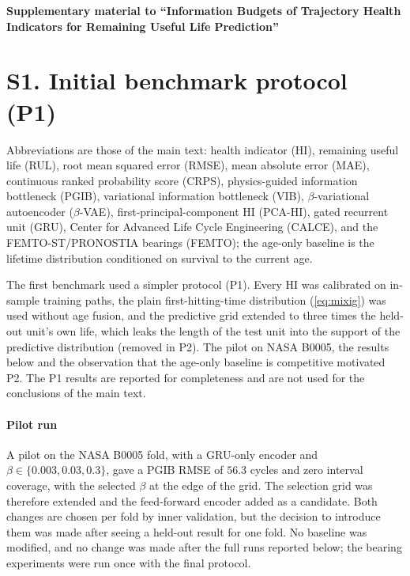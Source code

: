 \documentclass[preprint,12pt]{elsarticle}
\theoremstyle{definition}
\begin{document}
\begin{center}\textbf{Supplementary material to ``Information Budgets of Trajectory Health Indicators for Remaining Useful Life Prediction''}\end{center}
\medskip
\section*{S1. Initial benchmark protocol (P1)}
Abbreviations are those of the main text: health indicator (HI), remaining useful life (RUL), root mean squared error (RMSE), mean absolute error (MAE), continuous ranked probability score (CRPS), physics-guided information bottleneck (PGIB), variational information bottleneck (VIB), $\beta$-variational autoencoder ($\beta$-VAE), first-principal-component HI (PCA-HI), gated recurrent unit (GRU), Center for Advanced Life Cycle Engineering (CALCE), and the FEMTO-ST/PRONOSTIA bearings (FEMTO); the age-only baseline is the lifetime distribution conditioned on survival to the current age.

The first benchmark used a simpler protocol (P1). Every HI was calibrated on in-sample training paths, the plain first-hitting-time distribution (\ref{eq:mixig}) was used without age fusion, and the predictive grid extended to three times the held-out unit's own life, which leaks the length of the test unit into the support of the predictive distribution (removed in P2). The pilot on NASA B0005, the results below and the observation that the age-only baseline is competitive motivated P2. The P1 results are reported for completeness and are not used for the conclusions of the main text.

\paragraph{Pilot run} A pilot on the NASA B0005 fold, with a GRU-only encoder and $\beta\in\{0.003,0.03,0.3\}$, gave a PGIB RMSE of $56.3$ cycles and zero interval coverage, with the selected $\beta$ at the edge of the grid. The selection grid was therefore extended and the feed-forward encoder added as a candidate. Both changes are chosen per fold by inner validation, but the decision to introduce them was made after seeing a held-out result for one fold. No baseline was modified, and no change was made after the full runs reported below; the bearing experiments were run once with the final protocol.

\begin{table}
\caption{Protocol P1, battery benchmarks, leave-one-unit-out (mean $\pm$ standard deviation over seeds). RMSE, MAE and CRPS in cycles.}
\centering\small
{}\\[4pt]
\\[4pt]
\label{tab:benchv1}
\end{table}
\end{document}

